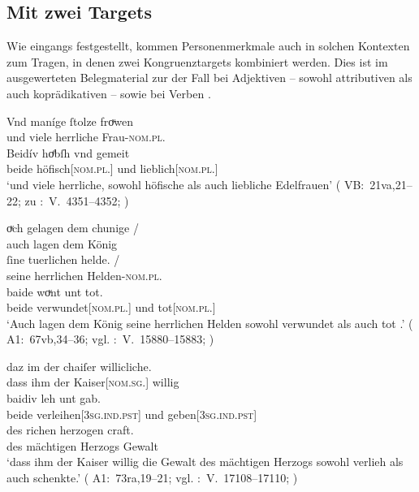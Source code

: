 \subsection{Mit zwei Targets}
\label{subsec:beidkoordtarg}

Wie eingangs festgestellt, kommen Personenmerkmale auch in
solchen Kontexten zum Tragen, in denen zwei Kongruenztargets kombiniert werden.
Dies ist im ausgewerteten Belegmaterial zur \KC{} der Fall bei Adjektiven --
sowohl attributiven  als auch
koprädikativen  -- sowie bei
Verben .

\largerpage %
\begin{exe}
\ex \begin{xlist}
	\ex\label{ex:konjattradj}
		\gll Vnd maníge ſtolze froͮwen \\
			und viele herrliche Frau-\textsc{nom.pl.\FemF} \\%
	\sn \gll Beidív hoͤbſh vnd gemeit \\
			beide höfisch[\textsc{nom.pl.\FemF}] und lieblich[\textsc{nom.pl.\FemF}] \\
		\trans `und viele herrliche, sowohl höfische als auch liebliche Edelfrauen'
			(%
				VB:~21va,21--22; zu
				\KC:~V.~4351--4352;
				\cite[161]{schroeder1895}%
			)

	\ex \label{ex:konjcopredadj}
		\gll oͮch gelagen dem chunige {/} \\
			auch lagen dem König \\
		\gll ſine tuerlichen helde. {/} \\
			seine herrlichen Helden-\textsc{nom.pl.\MascM} \\
		\gll baide woͮnt unt tot. \\
			beide verwundet[\textsc{nom.pl.\MascM}] und tot[\textsc{nom.pl.\MascM}] \\
		\trans `Auch lagen dem König seine herrlichen Helden sowohl verwundet als auch tot .'
			(%
				A1:~67vb,34--36; vgl.
				\KC:~V.~15880--15883;
				\cite[368]{schroeder1895}%
			)

	\ex \label{ex:konjvb}
		\gll daz im der chaiſer willicliche. \\
			dass ihm der Kaiser[\textsc{nom.sg.\MascM}] willig \\
	\sn \gll baidiv leh unt gab. \\
			beide verleihen[\textsc{3sg\subM.ind.pst}] und
			geben[\textsc{3sg\subM.ind.pst}] \\
	\sn \gll des richen herzogen craft. \\
			des mächtigen Herzogs Gewalt \\
		\trans `dass ihm der Kaiser willig die Gewalt des mächtigen Herzogs sowohl verlieh als auch schenkte.'
			(%
				A1:~73ra,19--21; vgl.
				\KC:~V.~17108--17110;
				\cite[389]{schroeder1895}%
			)
	\end{xlist}
\end{exe}

